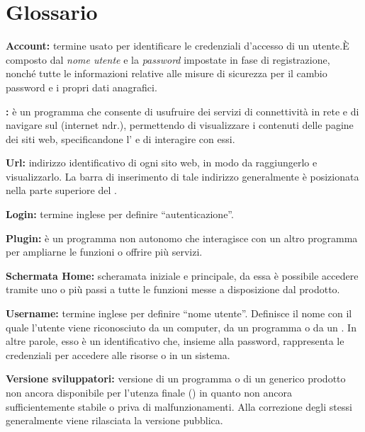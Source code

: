 \section{Glossario}
\begin{description}
\item\textbf{Account:} termine usato per identificare le credenziali d'accesso di un utente.È composto dal \textit{nome utente} e la \textit{password} impostate in fase di registrazione, nonché tutte le informazioni relative alle misure di sicurezza per il cambio password e i propri dati anagrafici.
\item\textbf{:} è un programma che consente di usufruire dei servizi di connettività in rete e di navigare sul  (internet ndr.), permettendo di visualizzare i contenuti delle pagine dei siti web, specificandone l' e di interagire con essi.
\item\textbf{Url:} indirizzo identificativo di ogni sito web, in modo da raggiungerlo e visualizzarlo. La barra di inserimento di tale indirizzo generalmente è posizionata nella parte superiore del .
\item\textbf{Login:} termine inglese per definire ``autenticazione''.
\item\textbf{Plugin:} è un programma non autonomo che interagisce con un altro programma per ampliarne le funzioni o offrire più servizi.
\item\textbf{Schermata Home:} scheramata iniziale e principale, da essa è possibile accedere tramite uno o più passi a tutte le funzioni messe a disposizione dal prodotto.
\item\textbf{Username:} termine inglese per definire ``nome utente''. Definisce il nome con il quale l'utente viene riconosciuto da un computer, da un programma o da un . In altre parole, esso è un identificativo che, insieme alla password, rappresenta le credenziali per accedere alle risorse o in un sistema.
\item\textbf{Versione sviluppatori:} versione di un programma o di un generico prodotto non ancora disponibile per l'utenza finale () in quanto non ancora sufficientemente  stabile o priva di malfunzionamenti. Alla correzione degli stessi generalmente viene rilasciata la versione pubblica.
\end{description}

